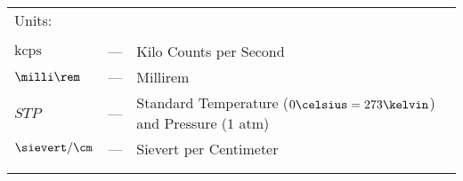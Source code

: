 \begin{longtable}{p{25mm} c p{120mm} }
\multicolumn{3}{l}{Units:}\\
\\
$\text{kcps}$ & --- & Kilo Counts per Second\\
$\milli\rem$ & --- & Millirem\\
$STP$ & --- & Standard Temperature ($0\celsius=273\kelvin$) and 
\newline
Pressure ($1$ atm)\\
$\sievert/\cm$ & --- & Sievert per Centimeter\\
\\
\\
\end{longtable}

